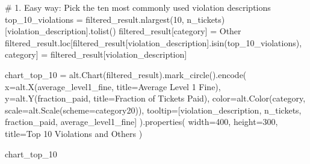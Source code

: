 \documentclass[
  letterpaper,
  DIV=11,
  numbers=noendperiod]{scrartcl}
\newenvironment{Shaded}{\begin{snugshade}}{\end{snugshade}}
\newcommand{\CommentTok}[1]{\textcolor[rgb]{0.37,0.37,0.37}{#1}}
\newcommand{\DecValTok}[1]{\textcolor[rgb]{0.68,0.00,0.00}{#1}}
\newcommand{\NormalTok}[1]{\textcolor[rgb]{0.00,0.23,0.31}{#1}}
\newcommand{\OperatorTok}[1]{\textcolor[rgb]{0.37,0.37,0.37}{#1}}
\newcommand{\StringTok}[1]{\textcolor[rgb]{0.13,0.47,0.30}{#1}}
\begin{document}
\begin{Shaded}
\begin{Highlighting}[]
\CommentTok{\# 1. Easy way: Pick the ten most commonly used violation descriptions}
\NormalTok{top\_10\_violations }\OperatorTok{=}\NormalTok{ filtered\_result.nlargest(}\DecValTok{10}\NormalTok{, }\StringTok{\textquotesingle{}n\_tickets\textquotesingle{}}\NormalTok{)[}\StringTok{\textquotesingle{}violation\_description\textquotesingle{}}\NormalTok{].tolist()}
\NormalTok{filtered\_result[}\StringTok{\textquotesingle{}category\textquotesingle{}}\NormalTok{] }\OperatorTok{=} \StringTok{\textquotesingle{}Other\textquotesingle{}}
\NormalTok{filtered\_result.loc[filtered\_result[}\StringTok{\textquotesingle{}violation\_description\textquotesingle{}}\NormalTok{].isin(top\_10\_violations), }\StringTok{\textquotesingle{}category\textquotesingle{}}\NormalTok{] }\OperatorTok{=}\NormalTok{ filtered\_result[}\StringTok{\textquotesingle{}violation\_description\textquotesingle{}}\NormalTok{]}

\NormalTok{chart\_top\_10 }\OperatorTok{=}\NormalTok{ alt.Chart(filtered\_result).mark\_circle().encode(}
\NormalTok{    x}\OperatorTok{=}\NormalTok{alt.X(}\StringTok{\textquotesingle{}average\_level1\_fine\textquotesingle{}}\NormalTok{, title}\OperatorTok{=}\StringTok{\textquotesingle{}Average Level 1 Fine\textquotesingle{}}\NormalTok{),}
\NormalTok{    y}\OperatorTok{=}\NormalTok{alt.Y(}\StringTok{\textquotesingle{}fraction\_paid\textquotesingle{}}\NormalTok{, title}\OperatorTok{=}\StringTok{\textquotesingle{}Fraction of Tickets Paid\textquotesingle{}}\NormalTok{),}
\NormalTok{    color}\OperatorTok{=}\NormalTok{alt.Color(}\StringTok{\textquotesingle{}category\textquotesingle{}}\NormalTok{, scale}\OperatorTok{=}\NormalTok{alt.Scale(scheme}\OperatorTok{=}\StringTok{\textquotesingle{}category20\textquotesingle{}}\NormalTok{)),}
\NormalTok{    tooltip}\OperatorTok{=}\NormalTok{[}\StringTok{\textquotesingle{}violation\_description\textquotesingle{}}\NormalTok{, }\StringTok{\textquotesingle{}n\_tickets\textquotesingle{}}\NormalTok{, }\StringTok{\textquotesingle{}fraction\_paid\textquotesingle{}}\NormalTok{, }\StringTok{\textquotesingle{}average\_level1\_fine\textquotesingle{}}\NormalTok{]}
\NormalTok{).properties(}
\NormalTok{    width}\OperatorTok{=}\DecValTok{400}\NormalTok{,}
\NormalTok{    height}\OperatorTok{=}\DecValTok{300}\NormalTok{,}
\NormalTok{    title}\OperatorTok{=}\StringTok{\textquotesingle{}Top 10 Violations and Others\textquotesingle{}}
\NormalTok{)}

\NormalTok{chart\_top\_10}
\end{Highlighting}
\end{Shaded}
\end{document}
